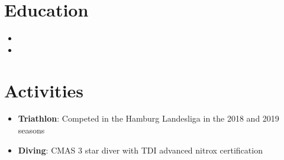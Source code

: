\documentclass{myfancycv}
\begin{document}
\section{Education}
  \vspace*{-0.5em}

\begin{itemize}
\item{}
\item{}
\end{itemize}

  \vspace*{-0.9em}
\section{Activities}

\begin{itemize}
  \vspace*{-0.5em}
  \item {\bf Triathlon}: Competed in the Hamburg Landesliga in the 2018 and 2019 seasons
  \item {\bf Diving}: CMAS 3 star diver with TDI advanced nitrox certification

\end{itemize}
\end{document}
